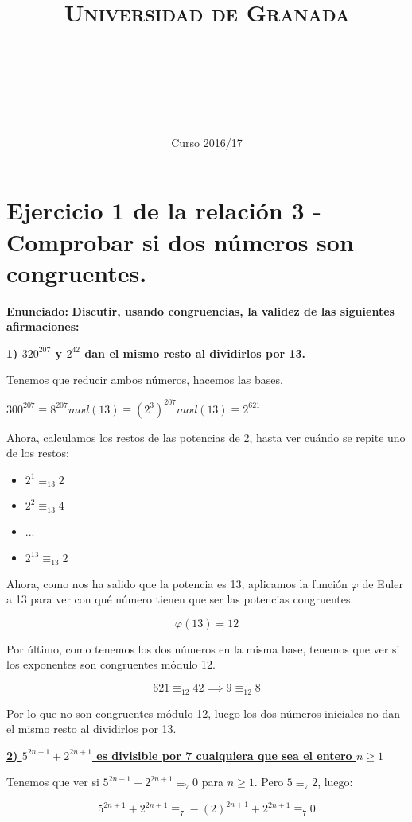\documentclass[11pt, a4paper, titlepage]{article}
\title{
  \normalfont \normalsize 
  \textsc{Universidad de Granada} \\ [25pt]    %
  \horrule{0.5pt} \\[0.4cm] %
  \huge \subject\\ %
  \horrule{2pt} \\[0.5cm] %
}
\author{\Large{\docauthor}}
\date{\vspace{-1.5em} \normalsize Curso 2016/17}
\theoremstyle{theorem-style}
\theoremstyle{definition-style}
\theoremstyle{remark-style}
\theoremstyle{example-style}
\begin{document}
\maketitle



\section{Ejercicio 1 de la relación 3 - Comprobar si dos números son congruentes.}


\textbf{Enunciado:}\textbf{ Discutir, usando congruencias, la validez de las siguientes afirmaciones:}

\underline{\textbf{1) $320^{207}$ y $2^{42}$ dan el mismo resto al dividirlos por 13.}}

Tenemos que reducir ambos números, hacemos las bases.

$300^{207}\equiv 8^{207}mod(13) \equiv (2^3)^{207} mod(13) \equiv 2^{621}$

Ahora, calculamos los restos de las potencias de 2, hasta ver cuándo se repite uno de los restos:

\begin{itemize}
	\item $2^1 \equiv_{13} 2$
	\item $2^2 \equiv_{13} 4$
	\item ...
	\item $2^{13} \equiv_{13} 2$
\end{itemize}

Ahora, como nos ha salido que la potencia es 13, aplicamos la función $\varphi$ de Euler a 13 para ver con qué número tienen que ser las potencias congruentes.

\[
\varphi(13) = 12
\]

Por último, como tenemos los dos números en la misma base, tenemos que ver si los exponentes son congruentes módulo 12.

\[
621 \equiv_{12} 42 \implies 9 \equiv_{12} 8
\]

Por lo que no son congruentes módulo 12, luego los dos números iniciales no dan el mismo resto al dividirlos por 13.

\textbf{\underline{2) $5^{2n+1} + 2^{2n+1}$ es divisible por 7 cualquiera que sea el entero $n \geq 1$}}

Tenemos que ver si $5^{2n+1} + 2^{2n+1} \equiv_7 0$ para $n\geq 1$. Pero $5\equiv_7 2$, luego:

\[
5^{2n+1} + 2^{2n+1} \equiv_7 -(2)^{2n+1} + 2^{2n+1} \equiv_7 0
\]
\end{document}
